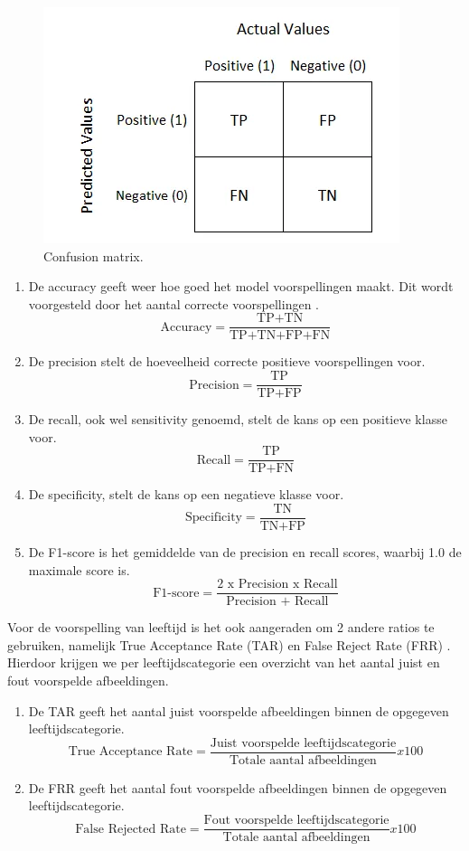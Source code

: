 \begin{figure}
    \centering
    \includegraphics{graphics/confusionmatrix.PNG}
    \caption[Confusion matrix]{\label{fig:confusionmatrix}Confusion matrix\autocite{Narkhede2018}.}
\end{figure}
\begin{enumerate}
    \item De accuracy geeft weer hoe goed het model voorspellingen maakt. Dit wordt voorgesteld door het aantal correcte voorspellingen  \autocite{Narkhede2018}.
    \[ \text{Accuracy} = \frac{\text{TP+TN}}{\text{TP+TN+FP+FN}} \]
    
    \item De precision stelt de hoeveelheid correcte positieve voorspellingen voor.
    \[ \text{Precision} = \frac{\text{TP}}{\text{TP+FP}} \]
    
    \item De recall, ook wel sensitivity genoemd, stelt de kans op een positieve klasse voor.  
    \[ \text{Recall} = \frac{\text{TP}}{\text{TP+FN}} \]
    
    \item De specificity, stelt de kans op een negatieve klasse voor.
    \[ \text{Specificity} = \frac{\text{TN}}{\text{TN+FP}} \]
    
    \item De F1-score is het gemiddelde van de precision en recall scores, waarbij 1.0 de maximale score is.
    \[ \text{F1-score} = \frac{\text{2 x Precision x Recall}}{\text{Precision + Recall}} \]
\end{enumerate}

Voor de voorspelling van leeftijd is het ook aangeraden om 2 andere ratios te gebruiken, namelijk True Acceptance Rate (TAR) en False Reject Rate (FRR) \autocite{Othman2014}. Hierdoor krijgen we per leeftijdscategorie een overzicht van het aantal juist en fout voorspelde afbeeldingen. 
\begin{enumerate}
    \item De TAR geeft het aantal juist voorspelde afbeeldingen binnen de opgegeven leeftijdscategorie.
    \[ \text{True Acceptance Rate} = \frac{\text{Juist voorspelde leeftijdscategorie}}{\text{Totale aantal afbeeldingen}} x 100 \]
     \item De FRR geeft het aantal fout voorspelde afbeeldingen binnen de opgegeven leeftijdscategorie.
    \[ \text{False Rejected Rate} = \frac{\text{Fout voorspelde leeftijdscategorie}}{\text{Totale aantal afbeeldingen}}  x 100 \]
\end{enumerate}